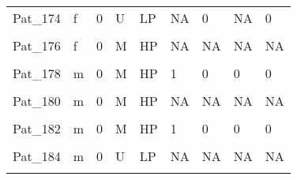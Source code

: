 \documentclass[11pt, a4paper, twosided]{book}
\begin{document}
\begin{longtable}[t]{l|l|r|l|l|l|l|l|l}
\cellcolor[HTML]{E2E868}{Pat\_173} & \cellcolor[HTML]{E2E868}{m} & \cellcolor[HTML]{E2E868}{0} & \cellcolor[HTML]{E2E868}{M} & \cellcolor[HTML]{E2E868}{HP} & \cellcolor[HTML]{E2E868}{1} & \cellcolor[HTML]{E2E868}{0} & \cellcolor[HTML]{E2E868}{0} & \cellcolor[HTML]{E2E868}{0}\\
\hline
Pat\_174 & f & 0 & U & LP & NA & 0 & NA & 0\\
\hline
\cellcolor[HTML]{E2E868}{Pat\_175} & \cellcolor[HTML]{E2E868}{m} & \cellcolor[HTML]{E2E868}{0} & \cellcolor[HTML]{E2E868}{U} & \cellcolor[HTML]{E2E868}{LP} & \cellcolor[HTML]{E2E868}{0} & \cellcolor[HTML]{E2E868}{0} & \cellcolor[HTML]{E2E868}{0} & \cellcolor[HTML]{E2E868}{0}\\
\hline
Pat\_176 & f & 0 & M & HP & NA & NA & NA & NA\\
\hline
\cellcolor[HTML]{E2E868}{Pat\_177} & \cellcolor[HTML]{E2E868}{f} & \cellcolor[HTML]{E2E868}{0} & \cellcolor[HTML]{E2E868}{NA} & \cellcolor[HTML]{E2E868}{IP} & \cellcolor[HTML]{E2E868}{NA} & \cellcolor[HTML]{E2E868}{1} & \cellcolor[HTML]{E2E868}{NA} & \cellcolor[HTML]{E2E868}{NA}\\
\hline
Pat\_178 & m & 0 & M & HP & 1 & 0 & 0 & 0\\
\hline
\cellcolor[HTML]{E2E868}{Pat\_179} & \cellcolor[HTML]{E2E868}{m} & \cellcolor[HTML]{E2E868}{0} & \cellcolor[HTML]{E2E868}{U} & \cellcolor[HTML]{E2E868}{LP} & \cellcolor[HTML]{E2E868}{0} & \cellcolor[HTML]{E2E868}{1} & \cellcolor[HTML]{E2E868}{0} & \cellcolor[HTML]{E2E868}{0}\\
\hline
Pat\_180 & m & 0 & M & HP & NA & NA & NA & NA\\
\hline
\cellcolor[HTML]{E2E868}{Pat\_181} & \cellcolor[HTML]{E2E868}{f} & \cellcolor[HTML]{E2E868}{0} & \cellcolor[HTML]{E2E868}{M} & \cellcolor[HTML]{E2E868}{HP} & \cellcolor[HTML]{E2E868}{NA} & \cellcolor[HTML]{E2E868}{NA} & \cellcolor[HTML]{E2E868}{NA} & \cellcolor[HTML]{E2E868}{NA}\\
\hline
Pat\_182 & m & 0 & M & HP & 1 & 0 & 0 & 0\\
\hline
\cellcolor[HTML]{E2E868}{Pat\_183} & \cellcolor[HTML]{E2E868}{f} & \cellcolor[HTML]{E2E868}{1} & \cellcolor[HTML]{E2E868}{NA} & \cellcolor[HTML]{E2E868}{IP} & \cellcolor[HTML]{E2E868}{1} & \cellcolor[HTML]{E2E868}{0} & \cellcolor[HTML]{E2E868}{0} & \cellcolor[HTML]{E2E868}{0}\\
\hline
Pat\_184 & m & 0 & U & LP & NA & NA & NA & NA\\
\hline
\cellcolor[HTML]{E2E868}{Pat\_185} & \cellcolor[HTML]{E2E868}{m} & \cellcolor[HTML]{E2E868}{0} & \cellcolor[HTML]{E2E868}{M} & \cellcolor[HTML]{E2E868}{HP} & \cellcolor[HTML]{E2E868}{NA} & \cellcolor[HTML]{E2E868}{NA} & \cellcolor[HTML]{E2E868}{NA} & \cellcolor[HTML]{E2E868}{NA}\\

\end{longtable}
\end{document}

